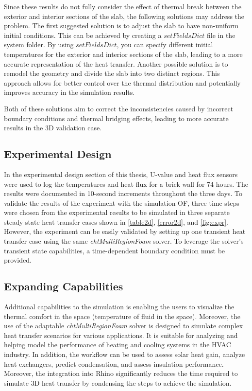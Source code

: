 Since these results do not fully consider the effect of thermal break between the exterior and interior sections of the slab, the following solutions may address the problem. The first suggested solution is to adjust the slab to have non-uniform initial conditions. This can be achieved by creating a $setFieldsDict$ file in the system folder. By using $setFieldsDict$, you can specify different initial temperatures for the exterior and interior sections of the slab, leading to a more accurate representation of the heat transfer. Another possible solution is to remodel the geometry and divide the slab into two distinct regions. This approach allows for better control over the thermal distribution and potentially improves accuracy in the simulation results.

Both of these solutions aim to correct the inconsistencies caused by incorrect boundary conditions and thermal bridging effects, leading to more accurate results in the 3D validation case.

\subsection{Experimental Design}
In the experimental design section of this thesis, U-value and heat flux sensors were used to log the temperatures and heat flux for a brick wall for 74 hours. The results were documented in 10-second increments throughout the three days. To validate the results of the experiment with the simulation \gls{OF}, three time steps were chosen from the experimental results to be simulated in three separate steady state heat transfer cases shown in \ref{table2d}, \ref{error2d}, and \ref{fig:expr}. However, the experiment can be easily validated by setting up one transient heat transfer case using the same \textit{chtMultiRegionFoam} solver. To leverage the solver's transient state capabilities, a time-dependent boundary condition must be provided. 


\subsection{Expanding Capabilities} %
Additional capabilities to the simulation is enabling the users to visualize the thermal comfort in the space (temperature of fluid in the space). Moreover, the use of the adaptable \textit{chtMultiRegionFoam} solver is designed to simulate complex heat transfer scenarios for various applications. It is suitable for analyzing and helping model the performance of heating and cooling systems in the HVAC  industry. In addition, the workflow can be used to assess solar heat gain, analyze heat exchangers, predict condensation, and assess insulation performance. Moreover, the integration into Rhino significantly reduces the time required to simulate 3D heat transfer by condensing the steps to achieve the simulation.



